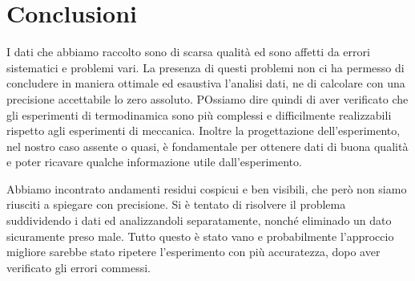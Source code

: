 \section{Conclusioni}

I dati che abbiamo raccolto sono di scarsa qualità ed sono affetti da errori sistematici e problemi vari.
La presenza di questi problemi non ci ha permesso di concludere in maniera ottimale ed esaustiva l'analisi dati, ne di
calcolare con una precisione accettabile lo zero assoluto. POssiamo dire quindi di aver verificato che gli esperimenti di
termodinamica sono più complessi e difficilmente realizzabili rispetto agli esperimenti di meccanica.
Inoltre la progettazione dell'esperimento, nel nostro caso assente o quasi, è fondamentale per ottenere dati di buona
qualità e poter ricavare qualche informazione utile dall'esperimento.

Abbiamo incontrato andamenti residui cospicui e ben visibili, che però non siamo riusciti a spiegare con precisione.
Si è tentato di risolvere il problema suddividendo i dati ed analizzandoli separatamente, nonché eliminado un dato
sicuramente preso male. Tutto questo è stato vano e probabilmente l'approccio migliore sarebbe stato ripetere
l'esperimento con più accuratezza, dopo aver verificato gli errori commessi.

